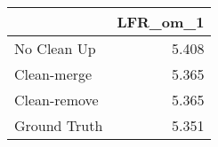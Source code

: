 \begin{tabular}{lr}
\toprule
{} & LFR_om_1 \\
\midrule
No Clean Up  &    5.408 \\
Clean-merge  &    5.365 \\
Clean-remove &    5.365 \\
Ground Truth &    5.351 \\
\bottomrule
\end{tabular}
